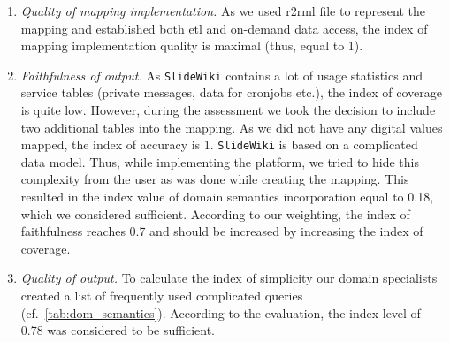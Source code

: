 \documentclass[PhD, Submit, ngerman,UKenglish,table]{scrbook}
\begin{document}
\begin{enumerate} 

\item{\emph{Quality of mapping implementation.}}
As we used \gls{r2rml} file to represent the mapping and established both \gls{etl} and on-demand data access, the index of mapping implementation quality is maximal (thus, equal to 1).

\item{\emph{Faithfulness of output.}}
As \texttt{SlideWiki} contains a lot of usage statistics and service tables (private messages, data for cronjobs etc.), the index of coverage is quite low.
However, during the assessment we took the decision to include two additional tables into the mapping.
As we did not have any digital values mapped, the index of accuracy is 1.
\texttt{SlideWiki} is based on a complicated data model.
Thus, while implementing the platform, we tried to hide this complexity from the user as was done while creating the mapping.
This resulted in the index value of domain semantics incorporation equal to 0.18, which we considered sufficient.
According to our weighting, the index of faithfulness reaches 0.7 and should be increased by increasing the index of coverage. 

\item{\emph{Quality of output.}}
To calculate the index of simplicity our domain specialists created a list of frequently used complicated queries (cf.~\autoref{tab:dom_semantics}).
According to the evaluation, the index level of 0.78 was considered to be sufficient.

\begin{table}[!ht]
\centering

\begin{tabular}{p{0.7\linewidth}|p{0.14\linewidth}}


\end{tabular}
\end{table}
\end{enumerate}
\end{document}
